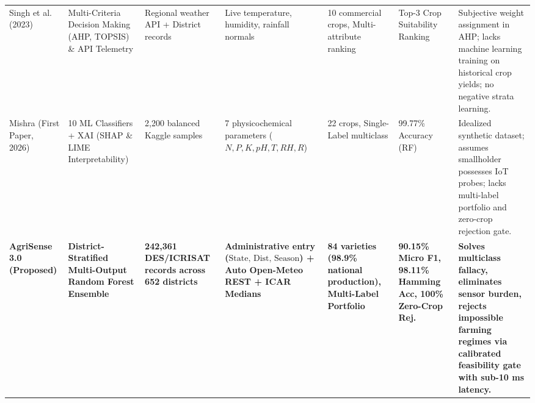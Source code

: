 \documentclass[conference]{IEEEtran}
\begin{document}
\begin{table}[t]
{\begin{tabular}{p{2.8cm}p{3.2cm}p{2.5cm}p{3.0cm}p{2.6cm}p{2.2cm}p{4.2cm}}
\addlinespace
Singh et al. (2023)~\cite{singh2022crop} & Multi-Criteria Decision Making (AHP, TOPSIS) \& API Telemetry & Regional weather API + District records & Live temperature, humidity, rainfall normals & 10 commercial crops, Multi-attribute ranking & Top-3 Crop Suitability Ranking & Subjective weight assignment in AHP; lacks machine learning training on historical crop yields; no negative strata learning. \\
\addlinespace
Mishra (First Paper, 2026)~\cite{mishra2026explainable} & 10 ML Classifiers + XAI (SHAP \& LIME Interpretability) & 2,200 balanced Kaggle samples & 7 physicochemical parameters ($N, P, K, pH, T, RH, R$) & 22 crops, Single-Label multiclass & 99.77\% Accuracy (RF) & Idealized synthetic dataset; assumes smallholder possesses IoT probes; lacks multi-label portfolio and zero-crop rejection gate. \\
\addlinespace
\textbf{AgriSense 3.0 (Proposed)} & \textbf{District-Stratified Multi-Output Random Forest Ensemble} & \textbf{242,361 DES/ICRISAT records across 652 districts} & \textbf{Administrative entry ($\text{State, Dist, Season}$) + Auto Open-Meteo REST + ICAR Medians} & \textbf{84 varieties (98.9\% national production), Multi-Label Portfolio} & \textbf{90.15\% Micro F1, 98.11\% Hamming Acc, 100\% Zero-Crop Rej.} & \textbf{Solves multiclass fallacy, eliminates sensor burden, rejects impossible farming regimes via calibrated feasibility gate with sub-10 ms latency.} \\
\bottomrule
\end{tabular}%
}
\end{table}
\end{document}
